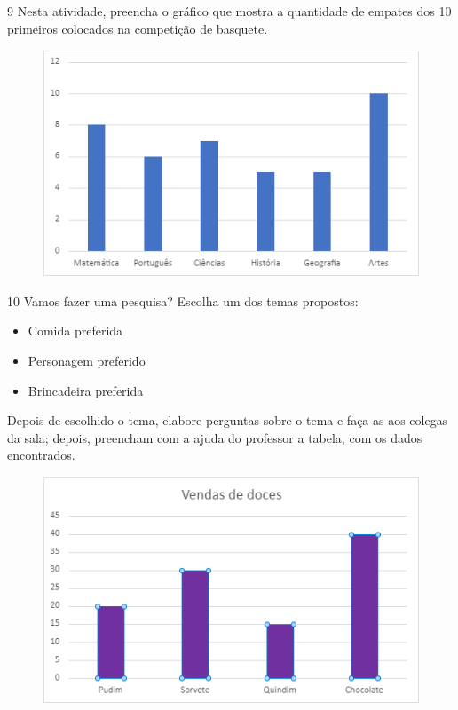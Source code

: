 
\num{9} Nesta atividade, preencha o gráfico que mostra a quantidade de empates
dos 10 primeiros colocados na competição de basquete.

\begin{figure}[htpb!]
\includegraphics[width=\textwidth]{./media/image97.png}
\end{figure}


\num{10} Vamos fazer uma pesquisa? Escolha um dos temas propostos:

\begin{itemize}
\item
  Comida preferida
\item
  Personagem preferido
\item
  Brincadeira preferida
\end{itemize}

\pagebreak
Depois de escolhido o tema, elabore perguntas sobre o tema e faça-as aos colegas da sala; depois,
preencham com a ajuda do professor a tabela, com os dados encontrados.

\begin{figure}[htpb!]
\includegraphics[width=\textwidth]{./media/image98.png}
\end{figure}


